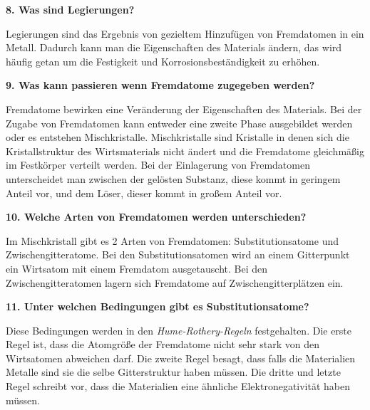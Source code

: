 \noindent\textbf{8. Was sind Legierungen?}\\
\begin{addmargin}[25pt]{0pt}   
Legierungen sind das Ergebnis von gezieltem Hinzufügen von Fremdatomen in ein Metall. Dadurch kann man die Eigenschaften des Materials ändern, das wird häufig getan um die Festigkeit und Korrosionsbeständigkeit zu erhöhen.\\
\end{addmargin}

\noindent\textbf{9. Was kann passieren wenn Fremdatome zugegeben werden?}\\
\begin{addmargin}[25pt]{0pt}   
Fremdatome bewirken eine Veränderung der Eigenschaften des Materials. Bei der Zugabe von Fremdatomen kann entweder eine zweite Phase ausgebildet werden oder es entstehen Mischkristalle. Mischkristalle sind Kristalle in denen sich die Kristallstruktur des Wirtsmaterials nicht ändert und die Fremdatome gleichmäßig im Festkörper verteilt werden. Bei der Einlagerung von Fremdatomen unterscheidet man zwischen der gelösten Substanz, diese kommt in geringem Anteil vor, und dem Löser, dieser kommt in großem Anteil vor. \\
\end{addmargin}

\noindent\textbf{10. Welche Arten von Fremdatomen werden unterschieden?}\\
\begin{addmargin}[25pt]{0pt}    
Im Mischkristall gibt es 2 Arten von Fremdatomen: Substitutionsatome und Zwischengitteratome. Bei den Substitutionsatomen wird an einem Gitterpunkt ein Wirtsatom mit einem Fremdatom ausgetauscht. Bei den Zwischengitteratomen lagern sich Fremdatome auf Zwischengitterplätzen ein.\\
\end{addmargin}

\noindent\textbf{11. Unter welchen Bedingungen gibt es Substitutionsatome?}\\
\begin{addmargin}[25pt]{0pt}     
Diese Bedingungen werden in den \textit{Hume-Rothery-Regeln} festgehalten. Die erste Regel ist, dass die Atomgröße der Fremdatome nicht sehr stark von den Wirtsatomen abweichen darf. Die zweite Regel besagt, dass falls die Materialien Metalle sind sie die selbe Gitterstruktur haben müssen. Die dritte und letzte Regel schreibt vor, dass die Materialien eine ähnliche Elektronegativität haben müssen.  \\
\end{addmargin}

